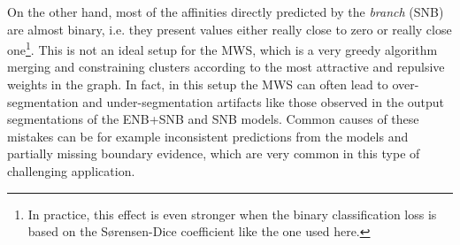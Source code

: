 On the other hand, most of the affinities directly predicted by the \emph{\sparseBr branch} (SNB) are almost binary, i.e. they present values either really close to zero or really close one\footnote{In practice, this effect is even stronger when the binary classification loss is based on the S\o rensen-Dice coefficient like the one used here.}.
This is not an ideal setup for the MWS, which is a very greedy algorithm merging and constraining clusters according to the most attractive and repulsive weights in the graph.
In fact, in this setup the MWS can often lead to over-segmentation and under-segmentation artifacts like those observed in the output segmentations of the ENB+SNB and SNB models. Common causes of these mistakes can be for example inconsistent predictions from the models and partially missing boundary evidence, which are very common in this type of challenging application. 

